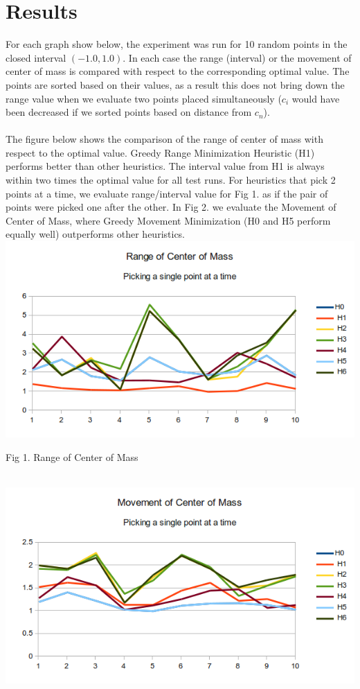 \documentclass[11pt]{article} %
\begin{document}
\section{Results}
 For each graph show below, the experiment was run for 10 random points in the closed interval $\left( -1.0, 1.0 \right)$. In each case the range (interval) or the movement of center of mass  is compared with respect to the corresponding optimal value. The points are sorted based on their values, as a result this does not bring down the range value when we evaluate two points placed simultaneously ($c_i$ would have been decreased if we sorted points based on distance from $c_n$).
 \\
 \\
 The figure below shows the comparison of the range of center of mass with respect to the optimal value.
Greedy Range Minimization Heuristic (H1) performs better than other heuristics. The interval value from H1 is always within two times the optimal value for all test runs.
For heuristics that pick 2 points at a time, we evaluate range/interval value for Fig 1. as if the pair of points were picked one after the other.  In Fig 2. we evaluate the Movement of Center of Mass, where Greedy Movement Minimization (H0 and H5 perform equally well) outperforms other heuristics. 
\\
\includegraphics{result0.png}
\begin{center}
\caption{Fig 1. Range of Center of Mass}
\end{center}
\\
\includegraphics{result1.png}
\end{document}
